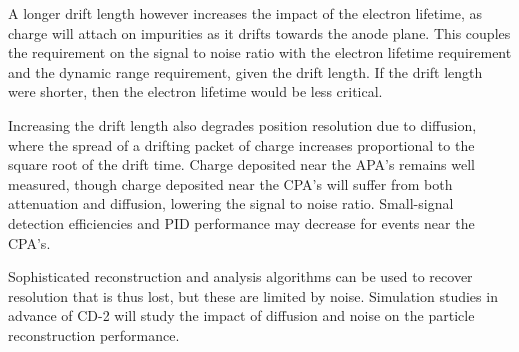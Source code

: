 A longer drift length however increases the impact of the electron
lifetime, as charge will attach on impurities as it drifts towards the
anode plane.  This couples the requirement on the signal to noise
ratio with the electron lifetime requirement and the dynamic range
requirement, given the drift length.  If the drift length were
shorter, then the electron lifetime would be less critical.

Increasing the drift length also degrades position resolution due to diffusion, where the
spread of a drifting packet of charge increases proportional to the square root of the
drift time.  Charge deposited near the APA's remains well measured, though charge deposited
near the CPA's will suffer from both attenuation and diffusion, lowering the signal to noise
ratio.  Small-signal detection efficiencies and PID performance may decrease for events
near the CPA's.

Sophisticated reconstruction and analysis algorithms can be used to recover resolution that
is thus lost, but these are limited by noise.  Simulation studies in advance of CD-2 will
study the impact of diffusion and noise on the particle reconstruction performance.
